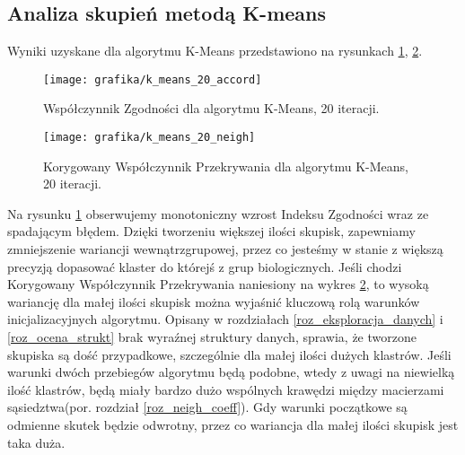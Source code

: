 \documentclass{article}
\begin{document}
\subsection{Analiza skupień metodą K-means}
\label{roz_anal_k_means}
Wyniki uzyskane dla algorytmu K-Means przedstawiono na rysunkach \ref{rysKMeansAccord}, \ref{rysKMeansNeigh}.
\begin{figure}
\texttt{[image: grafika/k\_means\_20\_accord]}
\caption{Współczynnik Zgodności dla algorytmu K-Means, 20 iteracji.}
\label{rysKMeansAccord}

\end{figure}

\begin{figure}
\texttt{[image: grafika/k\_means\_20\_neigh]}
\caption{Korygowany Współczynnik Przekrywania dla algorytmu K-Means, 20 iteracji.}
\label{rysKMeansNeigh}

\end{figure}



Na rysunku \ref{rysKMeansAccord} obserwujemy monotoniczny wzrost Indeksu Zgodności wraz ze spadającym błędem.
Dzięki tworzeniu większej ilości skupisk, zapewniamy zmniejszenie wariancji wewnątrzgrupowej, przez co jesteśmy w stanie z większą precyzją dopasować klaster do którejś z grup biologicznych.
Jeśli chodzi Korygowany Współczynnik Przekrywania naniesiony na wykres \ref{rysKMeansNeigh}, to wysoką wariancję dla małej ilości skupisk można wyjaśnić kluczową rolą warunków inicjalizacyjnych algorytmu.
Opisany w rozdziałach \ref{roz_eksploracja_danych} i \ref{roz_ocena_strukt} brak wyraźnej struktury danych, sprawia, że tworzone skupiska są dość przypadkowe, szczególnie dla małej ilości dużych klastrów.
Jeśli warunki dwóch przebiegów algorytmu będą podobne, wtedy z uwagi na niewielką ilość klastrów, będą miały bardzo dużo wspólnych krawędzi między macierzami sąsiedztwa(por. rozdział \ref{roz_neigh_coeff}).
Gdy warunki początkowe są odmienne skutek będzie odwrotny, przez co wariancja dla małej ilości skupisk jest taka duża.
\FloatBarrier
\end{document}
